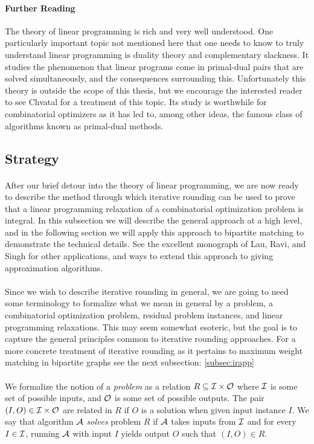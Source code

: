 \paragraph{Further Reading}
The theory of linear programming is rich and very well understood. One particularly important topic not mentioned here that one needs to know to truly understand linear programming is duality theory and complementary slackness. It studies the phenomenon that linear programs come in primal-dual pairs that are solved simultaneously, and the consequences surrounding this. Unfortunately this theory is outside the scope of this thesis, but we encourage the interested reader to see Chvatal \cite{chvatal1983linear} for a treatment of this topic. Its study is worthwhile for combinatorial optimizers as it has led to, among other ideas, the famous class of algorithms known as primal-dual methods.
\subsection{Strategy}
\paragraph{}
After our brief detour into the theory of linear programming, we are now ready to describe the method through which iterative rounding can be used to prove that a linear programming relaxation of a combinatorial optimization problem is integral. In this subsection we will describe the general approach at a high level, and in the following section we will apply this approach to bipartite matching to demonstrate the technical details. See the excellent monograph of Lau, Ravi, and Singh\cite{lau2011iterative} for other applications, and ways to extend this approach to giving approximation algorithms.
\paragraph{}
Since we wish to describe iterative rounding in general, we are going to need some terminology to formalize what we mean in general by a problem, a combinatorial optimization problem, residual problem instances, and linear programming relaxations. This may seem somewhat esoteric, but the goal is to capture the general principles common to iterative rounding approaches. For a more concrete treatment of iterative rounding as it pertains to maximum weight matching in bipartite graphs see the next subsection: \ref{subsec:irapp}

\paragraph{}We formalize the notion of a {\it problem} as a relation $R \subseteq \mathcal{I} \times \mathcal{O}$ where $\mathcal{I}$ is some set of possible inputs, and $\mathcal{O}$ is some set of possible outputs. The pair $(I,O) \in \mathcal{I} \times \mathcal{O}$ are related in $R$ if $O$ is a solution when given input instance $I$. We say that algorithm $\mathcal{A}$ {\it solves} problem $R$ if $\mathcal{A}$ takes inputs from $\mathcal{I}$ and for every $I \in \mathcal{I}$, running $\mathcal{A}$ with input $I$ yields output $O$ such that $(I,O) \in R$. 

